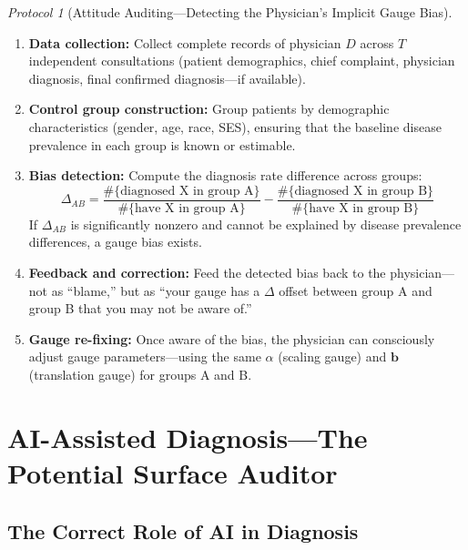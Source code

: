 \documentclass[12pt,a4paper]{article}
\theoremstyle{remark}
\newtheorem{protocol}[theorem]{Protocol}
\begin{document}
\begin{protocol}[Attitude Auditing---Detecting the Physician's Implicit Gauge Bias]\label{prot:attitude_audit}
\begin{enumerate}[label=(\arabic*),itemsep=3pt]
    \item \textbf{Data collection:} Collect complete records of physician $D$ across $T$ independent consultations (patient demographics, chief complaint, physician diagnosis, final confirmed diagnosis---if available).
    \item \textbf{Control group construction:} Group patients by demographic characteristics (gender, age, race, SES), ensuring that the baseline disease prevalence in each group is known or estimable.
    \item \textbf{Bias detection:} Compute the diagnosis rate difference across groups:
    \begin{equation}
        \Delta_{AB} = \frac{\#\{\text{diagnosed X in group A}\}}{\#\{\text{have X in group A}\}} - \frac{\#\{\text{diagnosed X in group B}\}}{\#\{\text{have X in group B}\}}
    \end{equation}
    If $\Delta_{AB}$ is significantly nonzero and cannot be explained by disease prevalence differences, a gauge bias exists.
    \item \textbf{Feedback and correction:} Feed the detected bias back to the physician---not as ``blame,'' but as ``your gauge has a $\Delta$ offset between group A and group B that you may not be aware of.''
    \item \textbf{Gauge re-fixing:} Once aware of the bias, the physician can consciously adjust gauge parameters---using the same $\alpha$ (scaling gauge) and $\mathbf{b}$ (translation gauge) for groups A and B.
\end{enumerate}
\end{protocol}

\section{AI-Assisted Diagnosis---The Potential Surface Auditor}
\label{sec:ai_audit}

\subsection{The Correct Role of AI in Diagnosis}
\end{document}
